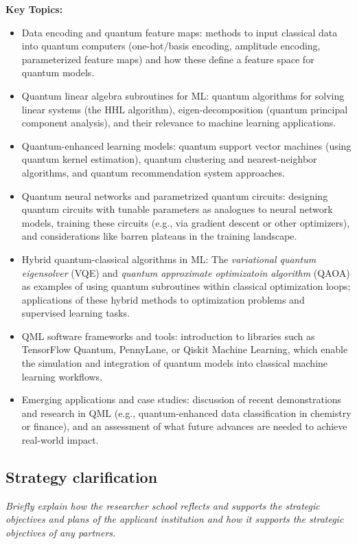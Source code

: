 \documentclass{scrreprt}
\begin{document}
\textbf{Key Topics:}
\begin{itemize}
\item Data encoding and quantum feature maps: methods to input classical data into quantum computers (one-hot/basis encoding, amplitude encoding, parameterized feature maps) and how these define a feature space for quantum models.
\item Quantum linear algebra subroutines for ML: quantum algorithms for solving linear systems (the HHL algorithm), eigen-decomposition (quantum principal component analysis), and their relevance to machine learning applications.
\item Quantum-enhanced learning models: quantum support vector machines (using quantum kernel estimation), quantum clustering and nearest-neighbor algorithms, and quantum recommendation system approaches.
\item Quantum neural networks and parametrized quantum circuits: designing quantum circuits with tunable parameters as analogues to neural network models, training these circuits (e.g., via gradient descent or other optimizers), and considerations like barren plateaus in the training landscape.
\item Hybrid quantum-classical algorithms in ML: The \textit{variational quantum eigensolver} (VQE) and \textit{quantum approximate optimizatoin algorithm} (QAOA) as examples of using quantum subroutines within classical optimization loops; applications of these hybrid methods to optimization problems and supervised learning tasks.
\item QML software frameworks and tools: introduction to libraries such as TensorFlow Quantum, PennyLane, or Qiskit Machine Learning, which enable the simulation and integration of quantum models into classical machine learning workflows.
\item Emerging applications and case studies: discussion of recent demonstrations and research in QML (e.g., quantum-enhanced data classification in chemistry or finance), and an assessment of what future advances are needed to achieve real-world impact.
\end{itemize}

\subsection{Strategy clarification}

\textit{Briefly explain how the researcher school reflects and supports the strategic objectives and plans of the applicant institution and how it supports the strategic objectives of any partners.}
\end{document}
